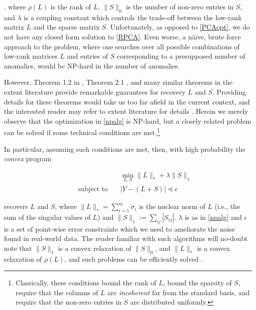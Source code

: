 \documentclass[conference]{IEEEtran}
\begin{document}
.
\noindent where $\rho(L)$ is the rank of $L$, $\|S\|_{0}$ is the
number of non-zero entries in $S$, and $\lambda$ is a coupling
constant which controls the trade-off between the low-rank matrix $L$
and the sparse matrix $S$.  Unfortunately, as opposed to
\eqref{PCAopt}, we do not have any closed form solution to
\eqref{RPCA}.   Even worse, a n\"{a}ive, brute force
approach to the problem, where one searches over all possible
combinations of low-rank matrices $L$ and entries of $S$ corresponding
to a presupposed number of anomalies, would be NP-hard in the number
of anomalies.

However, Theorem 1.2 in \cite{Candes2011}, Theorem 2.1
\cite{Paffenroth2012a}, and many similar theorems in the extent
literature provide remarkable guarantees for recovery $L$ and $S$.
Providing details for these theorems would take us too far afield in
the current context, and the interested reader may refer to extent
literature for details \cite{Candes2009, candes09ex, Chandrasekaran2009,
  Candes2011, Paffenroth2012a, Paffenroth2013b}.
Herein we merely observe that the optimization in \eqref{npalg} is
NP-hard, but a closely related problem can be solved if some technical
conditions are met.\footnote{Classically, these conditions bound the
  rank of $L$, bound the sparsity of $S$, require that the columns of
  $L$ are \textit{incoherent} far from the standard basis, and require
  that the non-zero entries in $S$ are distributed uniformly.}

In particular, assuming such conditions are met, then, with high
probability the \emph{convex} program

\begin{align} \label{mainalg}
  &\min_{L,S}\|L\|_{*}+\lambda\|S\|_{1}\\ \nonumber
  \qquad \text{subject to} \quad &
                                   |Y-(L+S)|
                                   \preceq \epsilon
\end{align}

\noindent recovers $L$ and $S$, where
$\|L\|_{*} = \sum_{i=1}^m\sigma_{i}$ is the nuclear norm of $L$ (i.e.,
the sum of the singular values of $L$) and
$\|S\|_1:= \sum_{ij}|S_{ij}|$.  $\lambda$ is as in \eqref{npalg} and
$\epsilon$ is a set of point-wise error constraints which we used to
ameliorate the noise found in real-world data.  The reader familiar
with such algorithms will no-doubt note that $\|S\|_1$ is a convex
relaxation of $\|S\|_0$, and $\|L\|_*$ is a convex relaxation of
$\rho(L)$, and such problems can be efficiently solved
\cite{Boyd2010a, Candes2009, Candes2011, Paffenroth2012a,
  Paffenroth2013b, Halko2011}.
\end{document}
